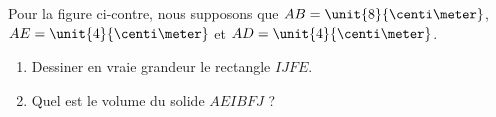 
\begin{exercice}\label{exoSeconde-0097}


    \begin{multicols}{2}
        Pour la figure ci-contre, nous supposons que \( AB=\unit{8}{\centi\meter}\), \( AE=\unit{4}{\centi\meter}\) et \( AD=\unit{4}{\centi\meter}\).
        \begin{enumerate}
            \item
                Dessiner en vraie grandeur le rectangle \( IJFE\).
            \item
                Quel est le volume du solide \( AEIBFJ\) ?
        \end{enumerate}

        \columnbreak


    \end{multicols}




\end{exercice}
